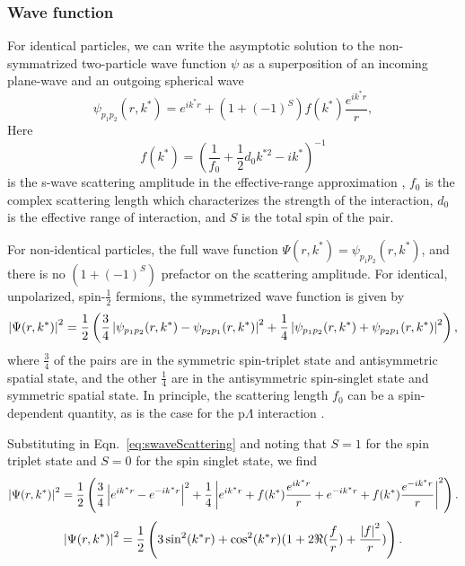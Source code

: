 \subsubsection{Wave function}
\label{sec:WaveFunction}




For identical particles, we can write the asymptotic solution to the non-symmatrized two-particle wave function $\psi$ as a superposition of an incoming plane-wave and an outgoing spherical wave
\begin{equation}
\label{eq:swaveScattering}
\psi_{p_1p_2}(r,k^*) = e^{ik^*r} + (1 + (-1)^S)f(k^*)\frac{e^{ik^*r}}{r},
\end{equation}
Here 
\begin{equation}
\label{eq:ScatteringAmplitude}
f(k^*) = \left(\frac{1}{f_0} + \frac{1}{2}d_0k^{*2}-ik^*\right)^{-1}
\end{equation}
is the s-wave scattering amplitude in the effective-range approximation \cite{LANDAU1977502}, $f_0$ is the complex scattering length which characterizes the strength of the interaction, $d_0$ is the effective range of interaction, and $S$ is the total spin of the pair.

For non-identical particles, the full wave function $\Psi(r,k^*) = \psi_{p_1p_2}(r,k^*)$, and there is no $(1 + (-1)^S)$ prefactor on the scattering amplitude. 
For identical, unpolarized, spin-$\frac{1}{2}$ fermions, the symmetrized wave function is given by 
\begin{equation}
\label{eq:SymmetrizedWaveFunction}
\left\lvert\Psi(r,k^*)\right\rvert^2 = \frac{1}{2}\left(\frac{3}{4} \left\lvert\psi_{p_1p_2}(r,k^*) - \psi_{p_2p_1}(r,k^*)\right\rvert^2
+ \frac{1}{4} \left\lvert\psi_{p_1p_2}(r,k^*) + \psi_{p_2p_1}(r,k^*)\right\rvert^2\right),
\end{equation}
where $\frac{3}{4}$ of the pairs are in the symmetric spin-triplet state and antisymmetric spatial state, and the other $\frac{1}{4}$ are in the antisymmetric spin-singlet state and symmetric spatial state.
In principle, the scattering length $f_0$ can be a spin-dependent quantity, as is the case for the p$\Lambda$ interaction \cite{Adams:2005ws}.

Substituting in Eqn.\ \ref{eq:swaveScattering} and noting that $S=1$ for the spin triplet state and $S=0$ for the spin singlet state, we find
\begin{equation}
\left\lvert\Psi(r,k^*)\right\rvert^2 = \frac{1}{2}\left(\frac{3}{4} \left\lvert e^{ik^*r} - e^{-ik^*r}\right\rvert^2
+ \frac{1}{4} \left\lvert e^{ik^*r} + f(k^*)\frac{e^{ik^*r}}{r} + e^{-ik^*r} + f(k^*)\frac{e^{-ik^*r}}{r}\right\rvert^2\right).
\end{equation}
\begin{equation}
\left\lvert\Psi(r,k^*)\right\rvert^2 =\frac{1}{2}\left(3\sin^2(k^*r)
+ \cos^2(k^*r)(1+2 \Re(\frac{f}{r}) + \frac{\left\lvert f\right\rvert^2}{r})  \right).
\end{equation}


